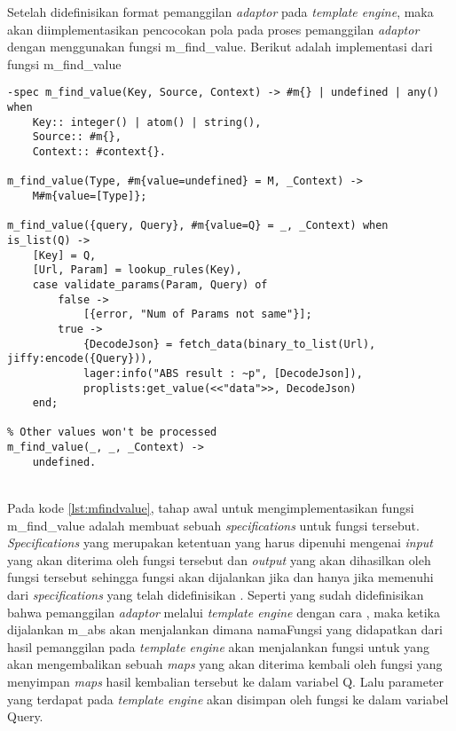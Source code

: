 Setelah didefinisikan format pemanggilan \textit{adaptor} pada \textit{template engine}, maka akan diimplementasikan pencocokan pola pada proses pemanggilan \textit{adaptor} dengan menggunakan fungsi m\_find\_value. Berikut adalah implementasi dari fungsi m\_find\_value

\begin{minipage}{\linewidth}
\begin{lstlisting}[caption={Implementasi fungsi m\_find\_value},label={lst:mfindvalue}]
% this method to handle call api from template
-spec m_find_value(Key, Source, Context) -> #m{} | undefined | any() when
    Key:: integer() | atom() | string(),
    Source:: #m{},
    Context:: #context{}.

m_find_value(Type, #m{value=undefined} = M, _Context) ->
    M#m{value=[Type]};

m_find_value({query, Query}, #m{value=Q} = _, _Context) when is_list(Q) ->
	[Key] = Q,
	[Url, Param] = lookup_rules(Key),
	case validate_params(Param, Query) of
		false ->
			[{error, "Num of Params not same"}];
		true ->
			{DecodeJson} = fetch_data(binary_to_list(Url), jiffy:encode({Query})),
			lager:info("ABS result : ~p", [DecodeJson]),
			proplists:get_value(<<"data">>, DecodeJson)
	end;

% Other values won't be processed
m_find_value(_, _, _Context) ->
    undefined. 
\end{lstlisting}
\end{minipage}\\

Pada kode \ref{lst:mfindvalue}, tahap awal untuk mengimplementasikan fungsi m\_find\_value adalah membuat sebuah \textit{specifications} untuk fungsi tersebut. \textit{Specifications} yang merupakan ketentuan yang harus dipenuhi mengenai \textit{input} yang akan diterima oleh fungsi tersebut dan \textit{output} yang akan dihasilkan oleh fungsi tersebut sehingga fungsi akan dijalankan jika dan hanya jika memenuhi dari \textit{specifications} yang telah didefinisikan \cite{article.rebecca}. Seperti yang sudah didefinisikan bahwa pemanggilan \textit{adaptor} melalui \textit{template engine} dengan cara , maka ketika dijalankan m\_abs akan menjalankan  dimana namaFungsi yang didapatkan dari hasil pemanggilan pada \textit{template engine} akan menjalankan fungsi  untuk yang akan mengembalikan sebuah \textit{maps} yang akan diterima kembali oleh fungsi  yang menyimpan \textit{maps} hasil kembalian tersebut ke dalam variabel Q. Lalu parameter yang terdapat pada \textit{template engine} akan disimpan oleh fungsi  ke dalam variabel Query.


